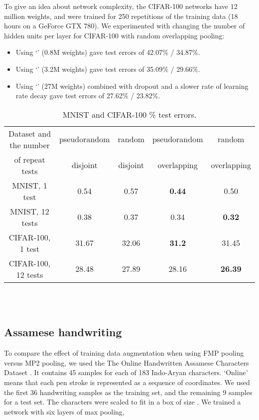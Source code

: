 \documentclass[english]{article}
\begin{document}
To give an idea about network complexity, the CIFAR-100 networks have 12 million weights, and were trained for 250 repetitions of the training data (18 hours on a GeForce GTX 780). We experimented with changing the number of hidden units per layer for CIFAR-100 with random overlapping pooling:
\begin{itemize}
\item Using `' (0.8M weights) gave test errors of 42.07\% / 34.87\%.
\item Using `' (3.2M weights) gave test errors of 35.09\% / 29.66\%.
\item Using `' (27M weights) combined with dropout and a slower rate of learning rate decay gave test errors of 27.62\% / 23.82\%.
\end{itemize}

\begin{table}
\centering{}
\begin{tabular}{|c|cccc|}
\hline
Dataset and the number & pseudorandom & random & pseudorandom  & random\\
of repeat tests & disjoint & disjoint & overlapping & overlapping\\
\hline
MNIST, 1 test & 0.54 & 0.57 & \textbf{0.44} & 0.50\\
MNIST, 12 tests & 0.38 & 0.37 & 0.34 & \textbf{0.32}\\
CIFAR-100, 1 test & 31.67 & 32.06 & \textbf{31.2} & 31.45\\
CIFAR-100, 12 tests & 28.48 & 27.89 & 28.16 & \textbf{26.39}\\
\hline
\end{tabular}
\ \\
\ \\
\caption{MNIST and CIFAR-100 \% test errors.\label{tab:MNIST-and-CIFAR-10} }
\end{table}



\subsection{Assamese handwriting }

To compare the effect of training data augmentation when using FMP
pooling versus MP2 pooling, we used the The Online Handwritten Assamese
Characters Dataset \cite{UCIrep}. It contains 45 samples for each
of 183 Indo-Aryan characters. `Online' means that each pen stroke is represented as a sequence of  coordinates.
We used the first 36 handwriting samples
as the training set, and the remaining 9 samples for a test set. The
characters were scaled to fit in a box of size . We trained
a network with six layers of  max pooling,
\end{document}
